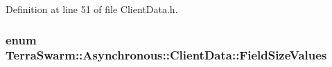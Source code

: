 Definition at line 51 of file Client\-Data.\-h.

\hypertarget{class_terra_swarm_1_1_asynchronous_1_1_client_data_ac66a46fcb609d1205cef15f85cd551b0}{
\subsubsection[{Field\-Size\-Values}]{\setlength{\rightskip}{0pt plus 5cm}enum {\bf Terra\-Swarm\-::\-Asynchronous\-::\-Client\-Data\-::\-Field\-Size\-Values}\hspace{0.3cm}{\ttfamily [private]}}}\label{class_terra_swarm_1_1_asynchronous_1_1_client_data_ac66a46fcb609d1205cef15f85cd551b0}
